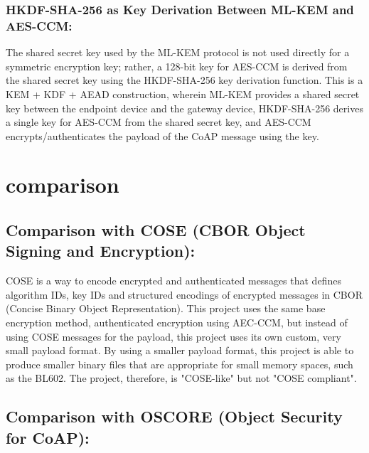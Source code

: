 \documentclass[a4paper]{scrartcl}
\begin{document}
        \subsubsection{HKDF-SHA-256 as Key Derivation Between ML-KEM and AES-CCM:}

        The shared secret key used by the ML-KEM protocol is not used directly for a symmetric encryption key; rather, a 128-bit key for AES-CCM is derived from the shared secret key using the HKDF-SHA-256 key derivation function. This is a KEM + KDF + AEAD construction, wherein ML-KEM provides a shared secret key between the endpoint device and the gateway device, HKDF-SHA-256 derives a single key for AES-CCM from the shared secret key, and AES-CCM encrypts/authenticates the payload of the CoAP message using the key.

    \section{comparison}
    \subsection{Comparison with COSE (CBOR Object Signing and Encryption):}
    
    COSE is a way to encode encrypted and authenticated messages that defines algorithm IDs, key IDs and structured encodings of encrypted messages in CBOR (Concise Binary Object Representation). This project uses the same base encryption method, authenticated encryption using AEC-CCM, but instead of using COSE messages for the payload, this project uses its own custom, very small payload format. By using a smaller payload format, this project is able to produce smaller binary files that are appropriate for small memory spaces, such as the BL602. The project, therefore, is "COSE-like" but not "COSE compliant".

    \subsection{Comparison with OSCORE (Object Security for CoAP):}
\end{document}
